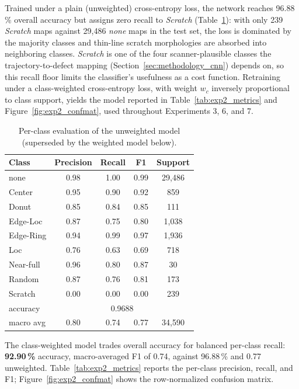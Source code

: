 Trained under a plain (unweighted) cross-entropy loss, the network reaches 96.88\,\% overall accuracy but assigns zero recall to \textit{Scratch} (Table~\ref{tab:exp2_metrics_unweighted}): with only 239 \textit{Scratch} maps against 29{,}486 \textit{none} maps in the test set, the loss is dominated by the majority classes and thin-line scratch morphologies are absorbed into neighboring classes. \textit{Scratch} is one of the four scanner-plausible classes the trajectory-to-defect mapping (Section~\ref{sec:methodology_cnn}) depends on, so this recall floor limits the classifier's usefulness as a cost function. Retraining under a class-weighted cross-entropy loss, with weight $w_c$ inversely proportional to class support, yields the model reported in Table~\ref{tab:exp2_metrics} and Figure~\ref{fig:exp2_confmat}, used throughout Experiments 3, 6, and 7.

\begin{table}[htbp]
\centering
\caption{Per-class evaluation of the unweighted model (superseded by the weighted model below).}
\label{tab:exp2_metrics_unweighted}
\begin{tabular}{lcccc}
\toprule
Class & Precision & Recall & F1 & Support \\
\midrule
none      & 0.98 & 1.00 & 0.99 & 29{,}486 \\
Center    & 0.95 & 0.90 & 0.92 & 859 \\
Donut     & 0.85 & 0.84 & 0.85 & 111 \\
Edge-Loc  & 0.87 & 0.75 & 0.80 & 1{,}038 \\
Edge-Ring & 0.94 & 0.99 & 0.97 & 1{,}936 \\
Loc       & 0.76 & 0.63 & 0.69 & 718 \\
Near-full & 0.96 & 0.80 & 0.87 & 30 \\
Random    & 0.87 & 0.76 & 0.81 & 173 \\
Scratch   & 0.00 & 0.00 & 0.00 & 239 \\
\midrule
accuracy  & \multicolumn{4}{c}{0.9688} \\
macro avg & 0.80 & 0.74 & 0.77 & 34{,}590 \\
\bottomrule
\end{tabular}
\end{table}

The class-weighted model trades overall accuracy for balanced per-class recall: \textbf{92.90\,\%} accuracy, macro-averaged F1 of 0.74, against 96.88\,\% and 0.77 unweighted. Table~\ref{tab:exp2_metrics} reports the per-class precision, recall, and F1; Figure~\ref{fig:exp2_confmat} shows the row-normalized confusion matrix.

